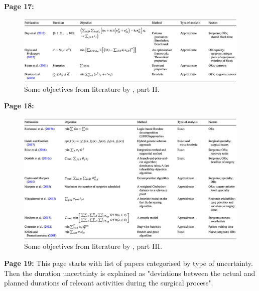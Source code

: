     \textbf{Page 17:}
    \begin{figure}[H]
        \centering
        \includegraphics[width=1\textwidth]{figures/SR0013CN19/fig4.png}
        \caption{Some objectives from literature by \cite{x203}, part II.}
        \label{fig4:SR0013CN19}
    \end{figure}
    
    \textbf{Page 18:}
    \begin{figure}[H]
        \centering
        \includegraphics[width=1\textwidth]{figures/SR0013CN19/fig5.png}
        \caption{Some objectives from literature by \cite{x203}, part III.}
        \label{fig5:SR0013CN19}
    \end{figure}

    \textbf{Page 19:}
    This page starts with list of papers categorised by type of uncertainty. Then the duration uncertainty is explained as "deviations between the actual and planned durations of relecant activities during the surgical process".


